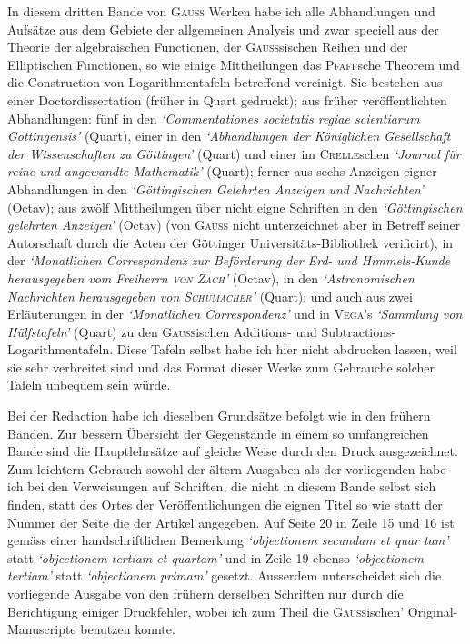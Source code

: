 In diesem dritten Bande von \textsc{Gauss} Werken habe ich alle Abhandlungen und Aufsätze aus dem
Gebiete der allgemeinen Analysis und zwar speciell aus der Theorie der algebraischen Functionen, der
\textsc{Gauss}sischen Reihen und der Elliptischen Functionen, so wie einige Mittheilungen das \textsc{Pfaff}sche Theorem
und die Construction von Logarithmentafeln betreffend vereinigt. Sie bestehen aus einer Doctordissertation
(früher in Quart gedruckt); aus früher veröffentlichten Abhandlungen: fünf in den \textit{‘Commentationes societatis regiae scientiarum Gottingensis’} (Quart), einer in den \textit{‘Abhandlungen der Königlichen Gesellschaft der}
\textit{Wissenschaften zu Göttingen’} (Quart) und einer im \textsc{Crelle}schen \textit{‘Journal für reine und angewandte Mathematik’} (Quart); ferner aus sechs Anzeigen eigner Abhandlungen in den \textit{‘Göttingischen Gelehrten Anzeigen}
\textit{und Nachrichten’} (Octav); aus zwölf Mittheilungen über nicht eigne Schriften in den \textit{‘Göttingischen gelehrten Anzeigen’} (Octav) (von \textsc{Gauss} nicht unterzeichnet aber in Betreff seiner Autorschaft durch die Acten
der Göttinger Universitäts-Bibliothek verificirt), in der \textit{‘Monatlichen Correspondenz zur Beförderung der Erd-}
\textit{und Himmels-Kunde herausgegeben vom Freiherrn \textsc{von Zach}’} (Octav), in den \textit{‘Astronomischen Nachrichten}
\textit{herausgegeben von \textsc{Schumacher}’} (Quart); und auch aus zwei Erläuterungen in der \textit{‘Monatlichen Correspondenz’}
und in \textsc{Vega}’s \textit{‘Sammlung von Hülfstafeln’} (Quart) zu den \textsc{Gauss}ischen Additions- und Subtractions-Logarithmentafeln. Diese Tafeln selbst habe ich hier nicht abdrucken lassen, weil sie sehr verbreitet sind und
das Format dieser Werke zum Gebrauche solcher Tafeln unbequem sein würde.

Bei der Redaction habe ich dieselben Grundsätze befolgt wie in den frühern Bänden. Zur bessern
Übersicht der Gegenstände in einem so umfangreichen Bande sind die Hauptlehrsätze auf gleiche Weise
durch den Druck ausgezeichnet. Zum leichtern Gebrauch sowohl der ältern Ausgaben als der vorliegenden
habe ich bei den Verweisungen auf Schriften, die nicht in diesem Bande selbst sich finden, statt des Ortes der
Veröffentlichungen die eignen Titel so wie statt der Nummer der Seite die der Artikel angegeben. Auf
Seite 20 in Zeile 15 und 16 ist gemäss einer handschriftlichen Bemerkung \textit{‘objectionem secundam et quar%
tam’} statt \textit{‘objectionem tertiam et quartam’} und in Zeile 19 ebenso \textit{‘objectionem tertiam’} statt \textit{‘objectionem}
\textit{primam’} gesetzt. Ausserdem unterscheidet sich die vorliegende Ausgabe von den frühern derselben Schriften nur durch die Berichtigung einiger Druckfehler, wobei ich zum Theil die \textsc{Gauss}ischen’ Original-Manuscripte benutzen konnte.

